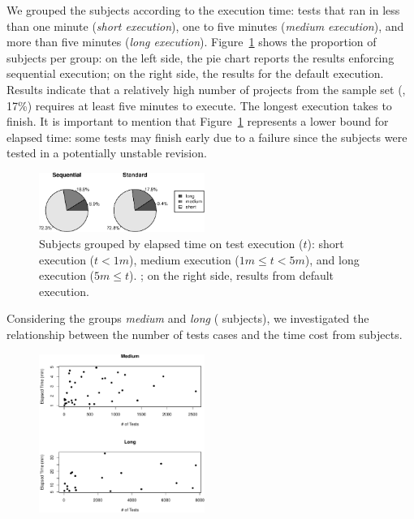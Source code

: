 We grouped the subjects according to the execution time: tests that
ran in less than one minute (\emph{short execution}), one to five
minutes (\emph{medium execution}), and more than five minutes
(\emph{long execution}).  Figure~\ref{fig:piechart-time} shows the
proportion of subjects per group: on the left side, the pie chart
reports the results enforcing sequential execution; on the right side,
the results for the default execution.  Results indicate that a
relatively high number of projects from the sample set (\ie, 17\%)
requires at least five minutes to execute. The longest execution takes
 to finish. It is important to mention that
Figure~\ref{fig:piechart-time} represents a lower bound for elapsed
time: some tests may finish early due to a failure since the subjects
were tested in a potentially unstable revision.

\begin{figure}[h!]
    \centering
    \includegraphics[width=0.48\textwidth]{plots/piechart-timecost.pdf}
    \caption{\label{fig:piechart-time} Subjects grouped by elapsed time on test
    execution ($t$): short execution ($t < 1m$), medium execution ($1m \leq t <
    5m$), and long execution ($5m \leq t$).  ; on the right side, results from default execution.}
\end{figure}

Considering the groups \emph{medium} and \emph{long} ( subjects), we
investigated the relationship between the number of tests cases and the time
cost from subjects. 

\begin{figure}[h!]%
    \centering
    \includegraphics[width=0.48\textwidth]{plots/scatter-tests-time.pdf}
    \caption{}%
    \label{fig:scatters}%
\end{figure}

